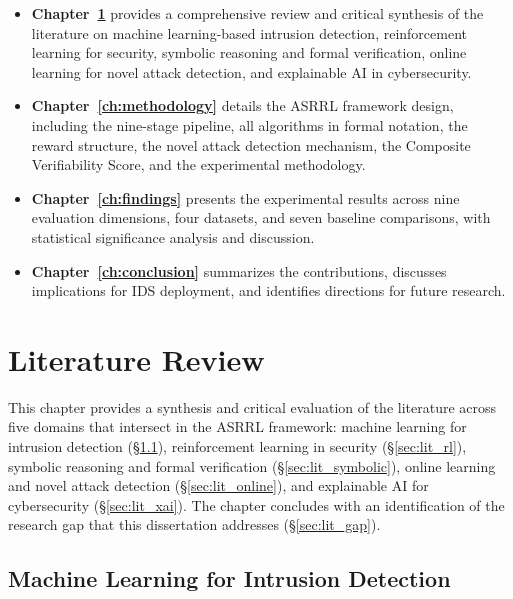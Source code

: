 \documentclass[12pt, letterpaper, oneside]{report}
\newcommand{\ASRRL}{\textsc{ASRRL}}
\begin{document}
\begin{itemize}
    \item \textbf{Chapter~\ref{ch:literature}} provides a comprehensive review and critical synthesis of the literature on machine learning-based intrusion detection, reinforcement learning for security, symbolic reasoning and formal verification, online learning for novel attack detection, and explainable AI in cybersecurity.

    \item \textbf{Chapter~\ref{ch:methodology}} details the \ASRRL{} framework design, including the nine-stage pipeline, all algorithms in formal notation, the reward structure, the novel attack detection mechanism, the Composite Verifiability Score, and the experimental methodology.

    \item \textbf{Chapter~\ref{ch:findings}} presents the experimental results across nine evaluation dimensions, four datasets, and seven baseline comparisons, with statistical significance analysis and discussion.

    \item \textbf{Chapter~\ref{ch:conclusion}} summarizes the contributions, discusses implications for IDS deployment, and identifies directions for future research.
\end{itemize}



\chapter{Literature Review}
\label{ch:literature}

This chapter provides a synthesis and critical evaluation of the literature across five domains that intersect in the \ASRRL{} framework: machine learning for intrusion detection (\S\ref{sec:lit_ml}), reinforcement learning in security (\S\ref{sec:lit_rl}), symbolic reasoning and formal verification (\S\ref{sec:lit_symbolic}), online learning and novel attack detection (\S\ref{sec:lit_online}), and explainable AI for cybersecurity (\S\ref{sec:lit_xai}). The chapter concludes with an identification of the research gap that this dissertation addresses (\S\ref{sec:lit_gap}).


\section{Machine Learning for Intrusion Detection}
\label{sec:lit_ml}
\end{document}
